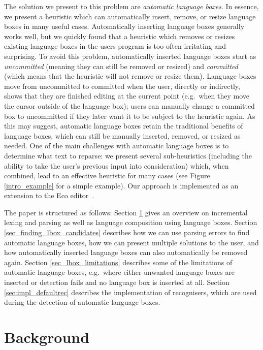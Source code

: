 \documentclass[sigplan,screen]{acmart}\settopmatter{printfolios=true,printccs=false,printacmref=false}
\begin{document}
The solution we present to this problem are \emph{automatic language boxes}. In
essence, we present a heuristic which can automatically insert, remove, or resize language
boxes in many useful cases. Automatically inserting language boxes generally
works well, but we quickly found that a heuristic which
removes or resizes existing language boxes in the users program is too often
irritating and surprising. To avoid this problem, automatically inserted
language boxes start as \emph{uncommitted} (meaning they can still be
removed or resized) and \emph{committed} (which means that the heuristic will
not remove or resize them). Language boxes
move from uncommitted to committed when the user, directly or indirectly, shows
that they are finished editing at the current point (e.g.~when they move the
cursor outside of the language box); users can manually change a committed box to uncommitted if they later
want it to be subject to the heuristic again. As this may suggest, automatic
language boxes retain the traditional benefits of language boxes, which can still
be manually inserted, removed, or resized as needed. One of the main challenges with
automatic language boxes is to determine what text to reparse: we present
several sub-heuristics (including the ability to take the user's previous input
into consideration) which, when combined, lead to an effective heuristic for
many cases (see Figure \ref{intro_example} for a simple example). Our
approach is implemented as an extension to the Eco editor~\cite{diekmann14eco}.

The paper is structured as follows: Section \ref{sec_background} gives an
overview on incremental lexing and parsing as well as language composition
using language boxes. Section \ref{sec_finding_lbox_candidates}
describes how we can use parsing errors to find automatic language boxes, how
we can present multiple solutions to the user, and how automatically inserted
language boxes can also automatically be removed again. Section
\ref{sec_lbox_limitations} describes some of the limitations of automatic
language boxes, e.g.~where either unwanted language boxes are inserted or
detection fails and no language box is inserted at all. Section
\ref{sec:impl_defaultrec} describes the implementation of recognisers, which
are used during the detection of automatic language boxes.



\section{Background}
\label{sec_background}
\end{document}
